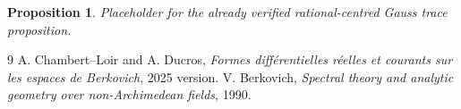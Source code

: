 \documentclass[11pt]{article}
\newtheorem{proposition}{Proposition}
\begin{document}
\begin{proposition}\label{prop:p062-rational-centred-traces}
Placeholder for the already verified rational-centred Gauss trace
proposition.
\end{proposition}


\begin{thebibliography}{9}
 A. Chambert--Loir and A. Ducros,
\emph{Formes différentielles réelles et courants sur les espaces de
Berkovich}, 2025 version.
 V. Berkovich,
\emph{Spectral theory and analytic geometry over non-Archimedean fields},
1990.
\end{thebibliography}
\end{document}
